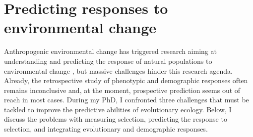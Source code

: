 \section{Predicting responses to environmental change}
Anthropogenic environmental change has triggered research aiming at understanding and predicting the response of natural populations to environmental change \parencite{parmesan2006, Chevin2012, Smallegange2013, Charmantier2014climate}, but massive challenges hinder this research agenda. Already, the retrospective study of phenotypic and demographic responses often remains inconclusive \parencite{Merila2001,McCarty2001, Charmantier2014climate, Brookfield2016} and, at the moment, prospective prediction seems out of reach in most cases. 
During my PhD, I confronted three challenges that must be tackled to improve the predictive abilities of evolutionary ecology. Below, I discuss the problems with measuring selection, predicting the response to selection, and integrating evolutionary and demographic responses.

